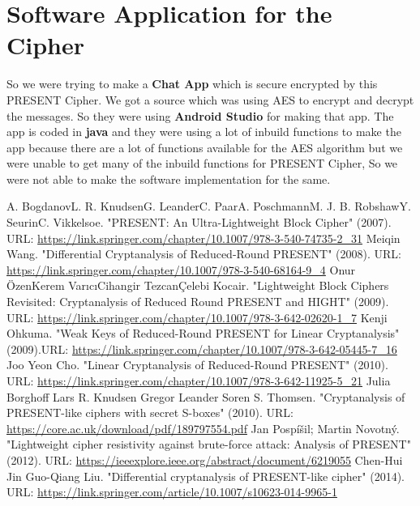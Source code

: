 \documentclass[journal=tosc,preprint]{iacrtrans}
\begin{document}
\section{Software Application for the Cipher}
So we were trying to make a \textbf{Chat App} which is secure encrypted by this PRESENT Cipher. We got a source which was using AES to encrypt and decrypt the messages. So they were using \textbf{Android Studio} for making that app. The app is coded in \textbf{java} and they were using a lot of inbuild functions to make the app because there are a lot of functions available for the AES algorithm but we were unable to get many of the inbuild functions for PRESENT Cipher, So we were not able to make the software implementation for the same.
%
%
\begin{thebibliography}{}
	 A. BogdanovL. R. KnudsenG. LeanderC. PaarA. PoschmannM. J. B. RobshawY. SeurinC. Vikkelsoe. "PRESENT: An Ultra-Lightweight Block Cipher" (2007). 
	URL:  \href{https://link.springer.com/chapter/10.1007/978-3-540-74735-2_31} {https://link.springer.com/chapter/10.1007/978-3-540-74735-2\_31}
	 Meiqin Wang. "Differential Cryptanalysis of Reduced-Round PRESENT" (2008). URL: \href{https://link.springer.com/chapter/10.1007/978-3-540-68164-9_4}{https://link.springer.com/chapter/10.1007/978-3-540-68164-9\_4}
	 Onur ÖzenKerem VarıcıCihangir TezcanÇelebi Kocair. "Lightweight Block Ciphers
	Revisited: Cryptanalysis of Reduced Round PRESENT and HIGHT" (2009). URL: \href{https://link.springer.com/chapter/10.1007/978-3-642-02620-1_7}{https://link.springer.com/chapter/10.1007/978-3-642-02620-1\_7}
	 Kenji Ohkuma. "Weak Keys of Reduced-Round PRESENT for Linear Cryptanalysis"
	(2009).URL: \href{https://link.springer.com/chapter/10.1007/978-3-642-05445-7_16}{https://link.springer.com/chapter/10.1007/978-3-642-05445-7\_16}
	 Joo Yeon Cho. "Linear Cryptanalysis of Reduced-Round PRESENT" (2010). URL: \href{https://link.springer.com/chapter/10.1007/978-3-642-11925-5_21}{https://link.springer.com/chapter/10.1007/978-3-642-11925-5\_21}
	 Julia Borghoff Lars R. Knudsen Gregor Leander Soren S. Thomsen. "Cryptanalysis
	of PRESENT-like ciphers with secret S-boxes" (2010). URL: \href{https://core.ac.uk/download/pdf/189797554.pdf}{https://core.ac.uk/download/pdf/189797554.pdf}
	 Jan Pospíšil; Martin Novotný. "Lightweight cipher resistivity against brute-force
	attack: Analysis of PRESENT" (2012). URL: \href{https://ieeexplore.ieee.org/abstract/document/6219055}{https://ieeexplore.ieee.org/abstract/document/6219055}
	 Chen-Hui Jin Guo-Qiang Liu. "Differential cryptanalysis of PRESENT-like cipher"
	(2014). URL: \href{https://link.springer.com/article/10.1007/s10623-014-9965-1}{https://link.springer.com/article/10.1007/s10623-014-9965-1}
\end{thebibliography}
\end{document}
